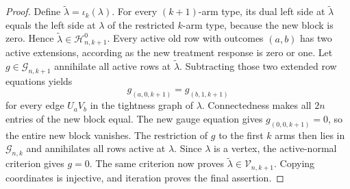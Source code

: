 \documentclass{article}
\begin{document}
\begin{proof}
Define \(\widetilde\lambda=\iota_k(\lambda)\). For every \((k+1)\)-arm type, its dual left side at \(\widetilde\lambda\) equals the left side at \(\lambda\) of the restricted \(k\)-arm type, because the new block is zero. Hence \(\widetilde\lambda\in\mathcal H^0_{n,k+1}\). Every active old row with outcomes \((a,b)\) has two active extensions, according as the new treatment response is zero or one. Let \(g\in\mathcal G_{n,k+1}\) annihilate all active rows at \(\widetilde\lambda\). Subtracting those two extended row equations yields
\[
g_{(a,0,k+1)}=g_{(b,1,k+1)}
\]
for every edge \(U_aV_b\) in the tightness graph of \(\lambda\). Connectedness makes all \(2n\) entries of the new block equal. The new gauge equation gives \(g_{(0,0,k+1)}=0\), so the entire new block vanishes. The restriction of \(g\) to the first \(k\) arms then lies in \(\mathcal G_{n,k}\) and annihilates all rows active at \(\lambda\). Since \(\lambda\) is a vertex, the active-normal criterion gives \(g=0\). The same criterion now proves \(\widetilde\lambda\in\mathcal V_{n,k+1}\). Copying coordinates is injective, and iteration proves the final assertion.
\end{proof}
\end{document}
